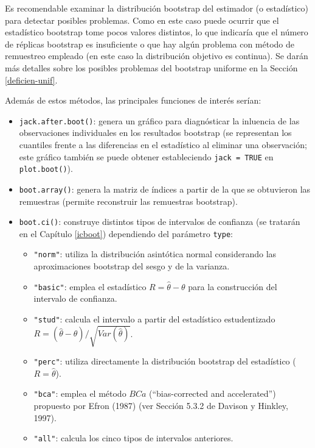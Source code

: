 \documentclass[
]{book}
\theoremstyle{break}
\theoremstyle{definition}
\theoremstyle{definition}
\theoremstyle{definition}
\theoremstyle{definition}
\theoremstyle{remark}
\begin{document}
Es recomendable examinar la distribución bootstrap del estimador (o estadístico) para detectar posibles problemas.
Como en este caso puede ocurrir que el estadístico bootstrap tome pocos valores distintos, lo que indicaría que el número de réplicas bootstrap es insuficiente o que hay algún problema con método de remuestreo empleado (en este caso la distribución objetivo es continua).
Se darán más detalles sobre los posibles problemas del bootstrap uniforme en la Sección \ref{deficien-unif}.

Además de estos métodos, las principales funciones de interés serían:

\begin{itemize}
\item
  \texttt{jack.after.boot()}: genera un gráfico para diagnósticar la inluencia
  de las observaciones individuales en los resultados bootstrap
  (se representan los cuantiles frente a las diferencias en el estadístico
  al eliminar una observación; este gráfico también se puede obtener estableciendo
  \texttt{jack\ =\ TRUE} en \texttt{plot.boot()}).
\item
  \texttt{boot.array()}: genera la matriz de índices a partir de la que se obtuvieron las remuestras (permite reconstruir las remuestras bootstrap).
\item
  \texttt{boot.ci()}: construye distintos tipos de intervalos de confianza
  (se tratarán en el Capítulo \ref{icboot}) dependiendo del parámetro \texttt{type}:

  \begin{itemize}
  \item
    \texttt{"norm"}: utiliza la distribución asintótica normal considerando las
    aproximaciones bootstrap del sesgo y de la varianza.
  \item
    \texttt{"basic"}: emplea el estadístico \(R = \hat \theta - \theta\) para la
    construcción del intervalo de confianza.
  \item
    \texttt{"stud"}: calcula el intervalo a partir del estadístico estudentizado
    \(R = \left( \hat \theta - \theta \right) / \sqrt{Var(\hat \theta)}\).
  \item
    \texttt{"perc"}: utiliza directamente la distribución bootstrap del estadístico
    (\(R = \hat \theta\)).
  \item
    \texttt{"bca"}: emplea el método \(BCa\) (``bias-corrected and accelerated'')
    propuesto por Efron (1987) (ver Sección 5.3.2 de Davison y Hinkley, 1997).
  \item
    \texttt{"all"}: calcula los cinco tipos de intervalos anteriores.
  \end{itemize}
\end{itemize}
\end{document}
